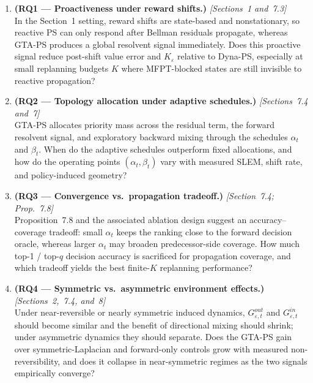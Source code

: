 \documentclass[10pt,a4paper]{article}
\begin{document}
\begin{enumerate}\setlength\itemsep{2pt}
  \item \textbf{(RQ1 --- Proactiveness under reward shifts.)} \textit{[Sections~1 and~7.3]}\\
    In the Section~1 setting, reward shifts are state-based and nonstationary, so reactive
    PS can only respond after Bellman residuals propagate, whereas GTA-PS produces a global
    resolvent signal immediately.  Does this proactive signal reduce post-shift value error
    and $K_{\varepsilon}$ relative to Dyna-PS, especially at small replanning budgets $K$
    where MFPT-blocked states are still invisible to reactive propagation?

  \item \textbf{(RQ2 --- Topology allocation under adaptive schedules.)} \textit{[Sections~7.4 and~7]}\\
    GTA-PS allocates priority mass across the residual term, the forward resolvent signal, and
    exploratory backward mixing through the schedules $\alpha_t$ and $\beta_t$.  When do the adaptive schedules
    outperform fixed allocations, and how do the operating points $(\alpha_t,\beta_t)$ vary
    with measured SLEM, shift rate, and policy-induced geometry?

  \item \textbf{(RQ3 --- Convergence vs.\ propagation tradeoff.)} \textit{[Section~7.4; Prop.~7.8]}\\
    Proposition~7.8 and the associated ablation design suggest an accuracy--coverage tradeoff:
    small $\alpha_t$ keeps the ranking close to the forward decision oracle, whereas larger $\alpha_t$
    may broaden predecessor-side coverage.  How much top-1 / top-$q$
    decision accuracy is sacrificed for propagation coverage, and which tradeoff yields the best
    finite-$K$ replanning performance?

  \item \textbf{(RQ4 --- Symmetric vs.\ asymmetric environment effects.)} \textit{[Sections~2,~7.4, and~8]}\\
    Under near-reversible or nearly symmetric induced dynamics, $G^{out}_{\varepsilon,t}$ and
    $G^{in}_{\varepsilon,t}$ should become similar and the benefit of directional mixing should
    shrink; under asymmetric dynamics they should separate.  Does the GTA-PS gain over
    symmetric-Laplacian and forward-only controls grow with measured non-reversibility,
    and does it collapse in near-symmetric regimes as the two signals empirically converge?


\end{enumerate}
\end{document}

